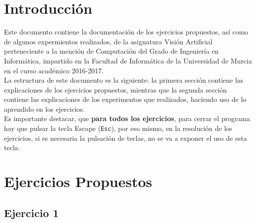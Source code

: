 \documentclass[a4paper,10pt,titlepage,oneside,openright]{book}
\begin{document}
\section*{}
\newpage

\pagestyle{fancy}
\fancyhf{}
\fancyfoot[CE,CO]{\thepage}

\renewcommand{\headrulewidth}{0.5pt} %
\renewcommand{\footrulewidth}{0.5pt}

\medskip
\section{Introducción}
Este documento contiene la documentación de los ejercicios propuestos, así como de algunos expermientos realizados, de la asignatura Visión Artificial perteneciente a la mención de Computación del Grado de Ingeniería en Informática, impartido en la Facultad de Informática de la Universidad de Murcia en el curso académico 2016-2017. \\

La estructura de este documento es la siguiente: la primera sección contiene las explicaciones de los ejercicios propuestos, mientras que la segunda sección contiene las explicaciones de los experimentos que realizados, haciendo uso de lo aprendido en los ejercicios. \\

Es importante destacar, que \textbf{para todos los ejercicios}, para cerrar el programa hay que pulsar la tecla Escape (\texttt{Esc}), por eso mismo, en la resolución de los ejercicios, si es necesaria la pulsación de teclas, no se va a exponer el uso de esta tecla.



\medskip
\section{Ejercicios Propuestos}


\medskip
\subsection{Ejercicio 1}
\end{document}

